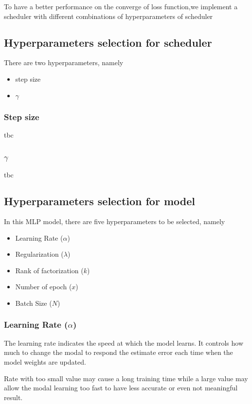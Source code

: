 \documentclass[final]{cvpr}
\begin{document}
To have a better performance on the converge of loss function,we implement a scheduler with different combinations of hyperparameters of scheduler
\subsection{Hyperparameters selection for scheduler}
There are two hyperparameters, namely
\begin{itemize}
    \item step size
    \item $\gamma$
\end{itemize}

\subsubsection{Step size}
tbc

\subsubsection{$\gamma$}
tbc

\subsection{Hyperparameters selection for model}
In this MLP model, there are five hyperparameters to be selected, namely
\begin{itemize}
	\item Learning Rate ($\alpha$)
	\item Regularization ($\lambda$)
	\item Rank of factorization ($k$)
	\item Number of epoch ($x$)
	\item Batch Size ($N$)
\end{itemize}


\subsubsection{Learning Rate ($\alpha$)}
The learning rate indicates the speed at which the model learns. It controls how much to change the modal to respond the estimate error each time when the model weights are updated.

Rate with too small value may cause a long training time while a large value may allow the modal learning too fast to have less accurate or even not meaningful result.
\end{document}
